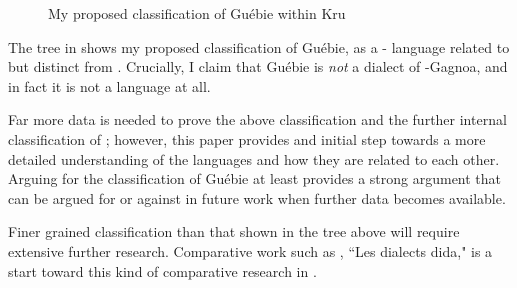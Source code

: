 \documentclass[output=paper,modfonts]{langscibook}
\begin{document}
\begin{figure}
\caption{My proposed classification of Guébie within Kru}
\label{myclassification}
\end{figure}

The tree in  shows my proposed classification of Guébie, as a - language related to but distinct from . Crucially, I claim that Guébie is \textit{not} a dialect of -Gagnoa, and in fact it is not a  language at all.

Far more data is needed to prove the above classification and the further internal classification of ; however, this paper provides and initial step towards a more detailed understanding of the  languages and how they are related to each other. Arguing for the classification of Guébie at least provides a strong argument that can be argued for or against in future work when further data becomes available. 

Finer grained classification than that shown in the tree above will require extensive further research. Comparative work such as \cite{Kaye1982}, ``Les dialects dida," is a start toward this kind of comparative research in .


%  
% 




\newpage 
\printbibliography[heading=subbibliography,notkeyword=this]
\end{document}
